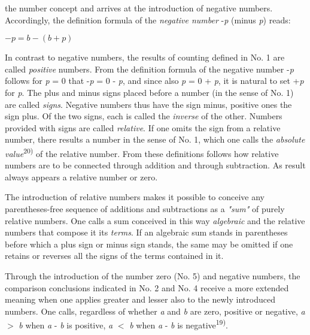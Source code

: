 \thispagestyle{fancy}

\vspace{0.5cm}

 the number concept and arrives at the introduction of negative numbers. Accordingly, the definition formula of the \textit{negative number} -\textit{p} (minus \textit{p}) reads:

\vspace{-0.3cm}
\begin{center}
$- p = b - (b + p)$
\end{center}
\vspace{-0.3cm}

In contrast to negative numbers, the results of counting defined in No. 1 are called \textit{positive} numbers. From the definition formula of the negative number -\textit{p} follows for \textit{p} = 0 that -\textit{p} = 0 - \textit{p}, and since also \textit{p} = 0 + \textit{p}, it is natural to set +\textit{p} for \textit{p}. The plus and minus signs placed before a number (in the sense of No. 1) are called \textit{signs}. Negative numbers thus have the sign minus, positive ones the sign plus. Of the two signs, each is called the \textit{inverse} of the other. Numbers provided with signs are called \textit{relative}. If one omits the sign from a relative number, there results a number in the sense of No. 1, which one calls the \textit{absolute value}\textsuperscript{20)} of the relative number. From these definitions follows how relative numbers are to be connected through addition and through subtraction. As result always appears a relative number or zero.

The introduction of relative numbers makes it possible to conceive any parentheses-free sequence of additions and subtractions as a \textit{"sum"} of purely relative numbers. One calls a sum conceived in this way \textit{algebraic} and the relative numbers that compose it its \textit{terms}. If an algebraic sum stands in parentheses before which a plus sign or minus sign stands, the same may be omitted if one retains or reverses all the signs of the terms contained in it.

Through the introduction of the number zero (No. 5) and negative numbers, the comparison conclusions indicated in No. 2 and No. 4 receive a more extended meaning when one applies greater and lesser also to the newly introduced numbers. One calls, regardless of whether \textit{a} and \textit{b} are zero, positive or negative, \textit{a} $>$ \textit{b} when \textit{a} - \textit{b} is positive, \textit{a} $<$ \textit{b} when \textit{a} - \textit{b} is negative\textsuperscript{19)}.

